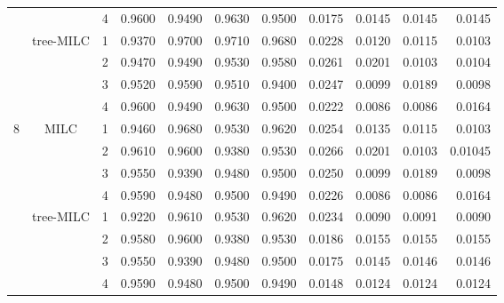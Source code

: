 \documentclass[a4paper, 11pt]{article} %
\begin{document}
\begin{table}[ht]
\begin{tabular}{cc r llll  rrrr }
  &&4  
 & 0.9600 & 0.9490 & 0.9630 & 0.9500 
  & 0.0175 & 0.0145 & 0.0145 & 0.0145 \\ 
 \cline{2-11}
   &\multirow{4}{*}{tree-MILC}
&  1 
& 0.9370 & 0.9700 & 0.9710 & 0.9680
 & 0.0228 & 0.0120 & 0.0115 & 0.0103 \\  
 && 2 
& 0.9470 & 0.9490 & 0.9530 & 0.9580
  & 0.0261 & 0.0201 & 0.0103 & 0.0104 \\
   &&3 
& 0.9520 & 0.9590 & 0.9510 & 0.9400
& 0.0247 & 0.0099 & 0.0189 & 0.0098 \\
  &&4  
 & 0.9600 & 0.9490 & 0.9630 & 0.9500 
 & 0.0222 & 0.0086 & 0.0086 & 0.0164 \\ 
    \hline
    \hline
    \multirow{8}{*}{8}
   & \multirow{4}{*}{MILC}
&  1 
& 0.9460 & 0.9680 & 0.9530 & 0.9620 
&  0.0254 & 0.0135 & 0.0115 & 0.0103 \\ 
 && 2 
& 0.9610 & 0.9600 & 0.9380 & 0.9530 
 & 0.0266 & 0.0201 & 0.0103 & 0.01045\\ 
   &&3 
 & 0.9550 & 0.9390 & 0.9480 & 0.9500
 &0.0250 & 0.0099 & 0.0189 & 0.0098 \\ 
  &&4  
& 0.9590 & 0.9480 & 0.9500 & 0.9490 
 &0.0226 & 0.0086 & 0.0086 & 0.0164 \\ 
 \cline{2-11}
   &\multirow{4}{*}{tree-MILC}
&  1 
& 0.9220 & 0.9610 & 0.9530 & 0.9620 
& 0.0234 & 0.0090 & 0.0091 & 0.0090 \\ 
 && 2 
& 0.9580 & 0.9600 & 0.9380 & 0.9530 
 & 0.0186 & 0.0155 & 0.0155 & 0.0155\\ 
   &&3 
 & 0.9550 & 0.9390 & 0.9480 & 0.9500
 & 0.0175 & 0.0145 & 0.0146 & 0.0146 \\ 
  &&4  
& 0.9590 & 0.9480 & 0.9500 & 0.9490 
 & 0.0148 & 0.0124 & 0.0124 & 0.0124 \\  
  \hline
\end{tabular}
\label{Table_covar_variance}
\end{table}
\end{document}
